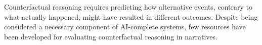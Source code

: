 Counterfactual reasoning requires predicting how alternative events, contrary to what actually happened, might have resulted in different outcomes. Despite being considered a necessary component of AI-complete systems, few resources have been developed for evaluating counterfactual reasoning in narratives.